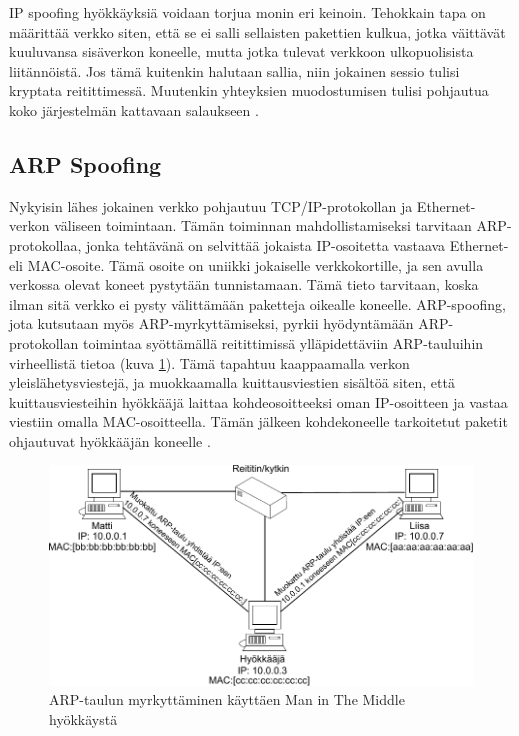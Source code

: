 IP spoofing hyökkäyksiä voidaan torjua monin eri keinoin. Tehokkain tapa on
määrittää verkko siten, että se ei salli sellaisten pakettien kulkua, jotka
väittävät kuuluvansa sisäverkon koneelle, mutta jotka tulevat verkkoon
ulkopuolisista liitännöistä. Jos tämä kuitenkin halutaan sallia, niin jokainen
sessio tulisi kryptata reitittimessä. Muutenkin yhteyksien muodostumisen tulisi
pohjautua koko järjestelmän kattavaan salaukseen \cite{WEBS}.

\subsection{ARP Spoofing}

Nykyisin lähes jokainen verkko pohjautuu TCP/IP-protokollan ja Ethernet-verkon
väliseen toimintaan. Tämän toiminnan mahdollistamiseksi tarvitaan ARP-pro\-to\-kol\-laa,
jonka tehtävänä on selvittää jokaista IP-osoitetta vastaava Ethernet- eli MAC-osoite. Tämä osoite
on uniikki jokaiselle verkkokortille, ja sen avulla verkossa olevat koneet pystytään tunnistamaan.
Tämä tieto tarvitaan, koska ilman sitä verkko ei pysty välittämään paketteja oikealle koneelle.
ARP-spoofing, jota kutsutaan myös ARP-myrkyttämiseksi, pyrkii hyödyntämään ARP-protokollan
toimintaa syöttämällä reitittimissä ylläpidettäviin ARP-tauluihin virheellistä
tietoa (kuva \ref{ARP-spoofing}). Tämä tapahtuu kaappaamalla verkon yleislähetysviestejä, ja muokkaamalla
kuittausviestien sisältöä siten, että kuittausviesteihin hyökkääjä laittaa
kohdeosoitteeksi oman IP-osoitteen ja vastaa viestiin omalla MAC-osoitteella.
Tämän jälkeen kohdekoneelle tarkoitetut paketit ohjautuvat hyökkääjän koneelle \cite{WEBS}.

\begin{figure}[ht]
\centering
\includegraphics[width=12cm]{pics/arp.pdf}
\caption{ARP-taulun myrkyttäminen käyttäen Man in The Middle hyökkäystä}
\label{ARP-spoofing}
\end{figure}


